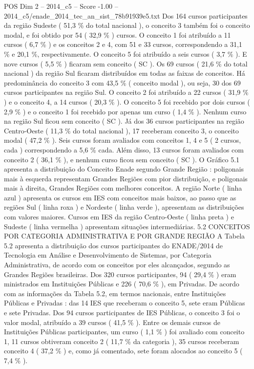 \begin{textsample}{POS Dim 2 – 2014\_c5 – Score -1.00 – 2014\_c5/enade\_2014\_tec\_an\_sist\_78b91939e5.txt}
Dos 164 cursos participantes da região Sudeste ( 51,3 \% do total nacional ), o conceito 3 também foi o conceito modal, e foi obtido por 54 ( 32,9 \% ) cursos.
O conceito 1 foi atribuído a 11 cursos ( 6,7 \% ) e os conceitos 2 e 4, com 51 e 33 cursos, correspondendo a 31,1 \% e 20,1 \%, respectivamente.
O conceito 5 foi atribuído a seis cursos ( 3,7 \% ).
E nove cursos ( 5,5 \% ) ficaram sem conceito ( SC ).
Os 69 cursos ( 21,6 \% do total nacional ) da região Sul ficaram distribuídos em todas as faixas de conceitos.
Há predominância do conceito 3 com 43,5 \% ( conceito modal ), ou seja, 30 dos 69 cursos participantes na região Sul.
O conceito 2 foi atribuído a 22 cursos ( 31,9 \% ) e o conceito 4, a 14 cursos ( 20,3 \% ).
O conceito 5 foi recebido por dois cursos ( 2,9 \% ) e o conceito 1 foi recebido por apenas um curso ( 1,4 \% ).
Nenhum curso na região Sul ficou sem conceito ( SC ).
Já dos 36 cursos participantes na região Centro-Oeste ( 11,3 \% do total nacional ), 17 receberam conceito 3, o conceito modal ( 47,2 \% ).
Seis cursos foram avaliados com conceitos 1, 4 e 5 ( 2 cursos, cada ) correspondendo a 5,6 \% cada.
Além disso, 13 cursos foram avaliados com conceito 2 ( 36,1 \% ), e nenhum curso ficou sem conceito ( SC ).
O Gráfico 5.1 apresenta a distribuição do Conceito Enade segundo Grande Região : poligonais mais à esquerda representam Grandes Regiões com pior distribuição, e poligonais mais à direita, Grandes Regiões com melhores conceitos.
A região Norte ( linha azul ) apresenta os cursos em IES com conceitos mais baixos, ao passo que as regiões Sul ( linha roxa ) e Nordeste ( linha verde ), apresentam as distribuições com valores maiores.
Cursos em IES da região Centro-Oeste ( linha preta ) e Sudeste ( linha vermelha ) apresentam situações intermediárias. 5.2 CONCEITOS POR CATEGORIA ADMINISTRATIVA E POR GRANDE REGIÃO A Tabela 5.2 apresenta a distribuição dos cursos participantes do ENADE/2014 de Tecnologia em Análise e Desenvolvimento de Sistemas, por Categoria Administrativa, de acordo com os conceitos por eles alcançados, segundo as Grandes Regiões brasileiras.
Dos 320 cursos participantes, 94 ( 29,4 \% ) eram ministrados em Instituições Públicas e 226 ( 70,6 \% ), em Privadas.
De acordo com as informações da Tabela 5.2, em termos nacionais, entre Instituições Públicas e Privadas : das 14 IES que receberam o conceito 5, sete eram Públicas e sete Privadas.
Dos 94 cursos participantes de IES Públicas, o conceito 3 foi o valor modal, atribuído a 39 cursos ( 41,5 \% ).
Entre os demais cursos de Instituições Públicas participantes, um curso ( 1,1 \% ) foi avaliado com conceito 1, 11 cursos obtiveram conceito 2 ( 11,7 \% da categoria ), 35 cursos receberam conceito 4 ( 37,2 \% ) e, como já comentado, sete foram alocados ao conceito 5 ( 7,4 \% ).

\end{textsample}
